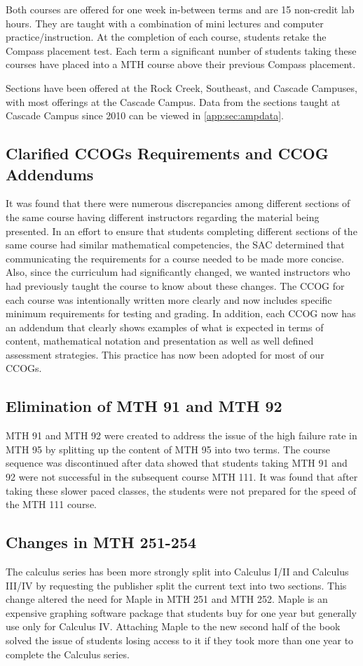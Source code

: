 Both courses are offered for one week in-between terms and are 15 non-credit lab hours.  They are taught with a combination of mini lectures and computer practice/instruction.  At the completion of each course, students retake the Compass placement test.  Each term a significant number of students taking these courses have placed into a MTH course above their previous Compass placement.

Sections have been offered at the Rock Creek, Southeast, and Cascade Campuses, with most offerings at the Cascade Campus.  Data from the sections taught at Cascade Campus since 2010 can be viewed in \vref{app:sec:ampdata}.
 
\subsection{Clarified CCOGs Requirements and CCOG Addendums}
It was found that there were numerous discrepancies among different sections of the same course having different instructors regarding the material being presented. In an effort to ensure that students completing different sections of the same course had similar mathematical competencies, the SAC determined that communicating the requirements for a course needed to be made more concise.  Also, since the curriculum had significantly changed, we wanted instructors who had previously taught the course to know about these changes.  The CCOG for each course was intentionally written more clearly and now includes specific minimum requirements for testing and grading.  In addition, each CCOG now has an addendum that clearly shows examples of what is expected in terms of content, mathematical notation and presentation as well as well defined assessment strategies.  This practice has now been adopted for most of our CCOGs.
 
\subsection{Elimination of MTH 91 and MTH 92}
MTH 91 and MTH 92 were created to address the issue of the high failure rate in MTH 95 by splitting up the content of MTH 95 into two terms.  The course sequence was discontinued after data showed that students taking MTH 91 and 92 were not successful in the subsequent course MTH 111. It was found that after taking these slower paced classes, the students were not prepared for the speed of the MTH 111 course.
 
\subsection{Changes in MTH 251-254}
The calculus series has been more strongly split into Calculus I/II and Calculus III/IV by requesting the publisher split the current text into two sections. This change altered the need for Maple in MTH 251 and MTH 252.  Maple is an expensive graphing software package that students buy for one year but generally use only for Calculus IV. Attaching Maple to the new second half of the book solved the issue of students losing access to it if they took more than one year to complete the Calculus series.


